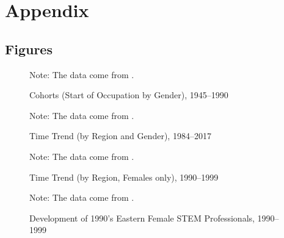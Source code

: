 \documentclass[a4paper, oneside, hyperfootnotes = false]{article}
\begin{document}
{\fontsize{11pt}{16.5pt}\selectfont

{}
\section*{Appendix}
\label{appendix}

{}
\subsection*{Figures}
\label{figures}

\begin{figure}[ht]
    \centering
    \caption{Cohorts (Start of Occupation by Gender), 1945–1990}
    \label{fig:mayer}
    \fontsize{9pt}{11pt}\selectfont
	\def\svgwidth{\textwidth}
	
    \vspace{2mm}
    \parbox{10cm}{
    \linespread{1}\footnotesize Note: The data come from \cite{Mayer1995}.}
\end{figure}

\begin{figure}[ht]
	\centering
	\caption{Time Trend (by Region and Gender), 1984–2017}
	\label{fig:timetrend}
	\fontsize{9pt}{11pt}\selectfont
	\def\svgwidth{\textwidth}
	
	\vspace{2mm}
	\parbox{10cm}{
	\linespread{1}\footnotesize Note: The data come from \cite{SOEP2023}.}
\end{figure}

\begin{figure}[ht]
	\centering
	\caption{Time Trend (by Region, Females only), 1990–1999}
	\label{fig:timetrendzoom}
	\fontsize{9pt}{11pt}\selectfont
	\def\svgwidth{\textwidth}
	
	\vspace{2mm}
	\parbox{10cm}{
	\linespread{1}\footnotesize Note: The data come from \cite{SOEP2023}.}
\end{figure}

\begin{figure}[ht]
	\centering
	\caption{Development of 1990's Eastern Female STEM Professionals, 1990–1999}
	\label{fig:survivalfemale}
	\fontsize{9pt}{11pt}\selectfont
	\def\svgwidth{\textwidth}
	
	\vspace{2mm}
	\parbox{10cm}{
	\linespread{1}\footnotesize Note: The data come from \cite{SOEP2023}.}
\end{figure}

}
\end{document}
